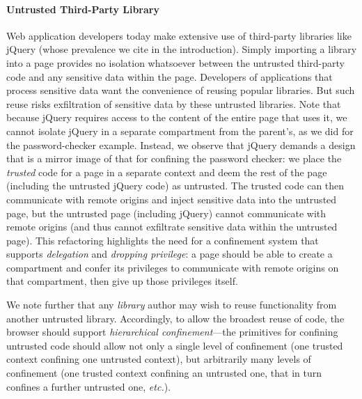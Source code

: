 \paragraph{Untrusted Third-Party Library}
Web application developers today make extensive use of third-party
libraries like jQuery (whose prevalence we cite in the
introduction). Simply importing a library into a page provides no
isolation whatsoever between the untrusted third-party code and any
sensitive data within the page. Developers of applications that
process sensitive data want the convenience of reusing popular
libraries. But such reuse risks exfiltration of sensitive data by
these untrusted libraries. Note that because jQuery requires access to
the content of the entire page that uses it, we cannot isolate jQuery
in a separate compartment from the parent's, as we did for the
password-checker example. Instead, we observe that jQuery demands a
design that is a mirror image of that for confining the password
checker: we place the {\em trusted} code for a page in a separate
context and deem the rest of the page (including the untrusted jQuery
code) as untrusted. The trusted code can then communicate with remote
origins and inject sensitive data into the untrusted page, but the
untrusted page (including jQuery) cannot communicate with remote
origins (and thus cannot exfiltrate sensitive data within the
untrusted page).
This refactoring highlights the need for a confinement system that
supports {\em delegation} and {\em dropping privilege}: a page should
be able to create a compartment and confer its privileges to
communicate with remote origins on that compartment, then give up
those privileges itself.

We note further that any {\em library} author
may wish to reuse functionality from another untrusted
library. Accordingly, to allow the broadest reuse of code, the browser
should support {\em hierarchical confinement}---the primitives for
confining untrusted code should allow not only a single level of
confinement (one trusted context confining one untrusted context), but
arbitrarily many levels of confinement (one trusted context confining
an untrusted one, that in turn confines a further untrusted one,
\emph{etc.}).


